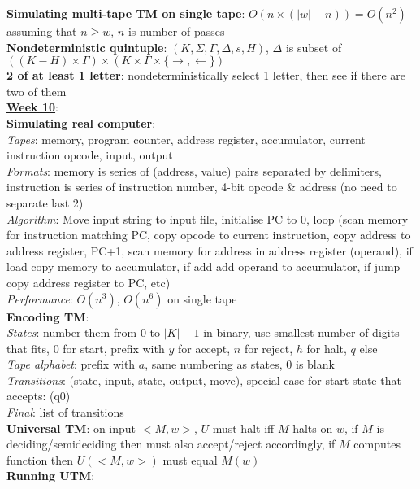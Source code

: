 \documentclass[a4paper]{article}
\begin{document}
\begin{multicols}{2}
        \textbf{Simulating multi-tape TM on single tape}: $O(n \times (|w| + n)) = O(n^2)$ assuming that $n \geq w$, $n$ is number of passes\\
        \textbf{Nondeterministic quintuple}: $(K, \Sigma, \Gamma, \Delta, s, H)$, $\Delta$ is subset of $((K-H)\times\Gamma) \times (K\times\Gamma\times \{ \to, \leftarrow \})$\\
        \textbf{2 of at least 1 letter}: nondeterministically select 1 letter, then see if there are two of them\\
        \underline{\textbf{Week 10}}:\\
        \textbf{Simulating real computer}:\\
        \textit{Tapes}: memory, program counter, address register, accumulator, current instruction opcode, input, output\\
        \textit{Formats}: memory is series of (address, value) pairs separated by delimiters, instruction is series of instruction number, 4-bit opcode \& address (no need to separate last 2)\\
        \textit{Algorithm}: Move input string to input file, initialise PC to 0, loop (scan memory for instruction matching PC, copy opcode to current instruction, copy address to address register, PC+1, scan memory for address in address register (operand), if load copy memory to accumulator, if add add operand to accumulator, if jump copy address register to PC, etc)\\
        \textit{Performance}: $O(n^3)$, $O(n^6)$ on single tape\\
        \textbf{Encoding TM}:\\
        \textit{States}: number them from 0 to $|K| - 1$ in binary, use smallest number of digits that fits, 0 for start, prefix with $y$ for accept, $n$ for reject, $h$ for halt, $q$ else\\
        \textit{Tape alphabet}: prefix with $a$, same numbering as states, 0 is blank\\
        \textit{Transitions}: (state, input, state, output, move), special case for start state that accepts: (q0)\\
        \textit{Final}: list of transitions\\
        \textbf{Universal TM}: on input $<M,w>$, $U$ must halt iff $M$ halts on $w$, if $M$ is deciding/semideciding then must also accept/reject accordingly, if $M$ computes function then $U(<M,w>)$ must equal $M(w)$\\
        \textbf{Running UTM}:\\

\end{multicols}
\end{document}
